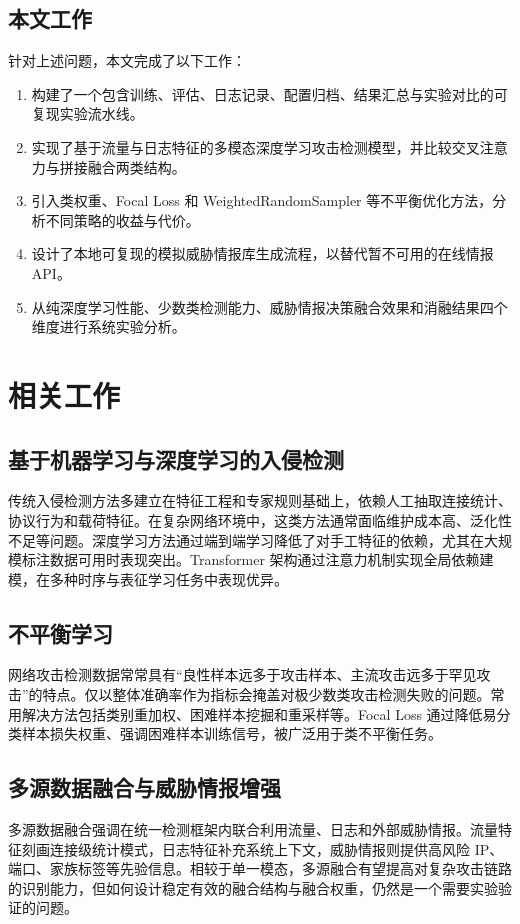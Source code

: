 \documentclass[UTF8,a4paper,12pt]{ctexart}
\begin{document}
\subsection{本文工作}
针对上述问题，本文完成了以下工作：
\begin{enumerate}[leftmargin=2em]
    \item 构建了一个包含训练、评估、日志记录、配置归档、结果汇总与实验对比的可复现实验流水线。
    \item 实现了基于流量与日志特征的多模态深度学习攻击检测模型，并比较交叉注意力与拼接融合两类结构。
    \item 引入类权重、Focal Loss 和 WeightedRandomSampler 等不平衡优化方法，分析不同策略的收益与代价。
    \item 设计了本地可复现的模拟威胁情报库生成流程，以替代暂不可用的在线情报 API。
    \item 从纯深度学习性能、少数类检测能力、威胁情报决策融合效果和消融结果四个维度进行系统实验分析。
\end{enumerate}

\section{相关工作}
\subsection{基于机器学习与深度学习的入侵检测}
传统入侵检测方法多建立在特征工程和专家规则基础上，依赖人工抽取连接统计、协议行为和载荷特征。在复杂网络环境中，这类方法通常面临维护成本高、泛化性不足等问题。深度学习方法通过端到端学习降低了对手工特征的依赖，尤其在大规模标注数据可用时表现突出。Transformer 架构通过注意力机制实现全局依赖建模，在多种时序与表征学习任务中表现优异\cite{vaswani2017attention}。

\subsection{不平衡学习}
网络攻击检测数据常常具有“良性样本远多于攻击样本、主流攻击远多于罕见攻击”的特点。仅以整体准确率作为指标会掩盖对极少数类攻击检测失败的问题。常用解决方法包括类别重加权、困难样本挖掘和重采样等。Focal Loss 通过降低易分类样本损失权重、强调困难样本训练信号，被广泛用于类不平衡任务\cite{lin2017focal}。

\subsection{多源数据融合与威胁情报增强}
多源数据融合强调在统一检测框架内联合利用流量、日志和外部威胁情报。流量特征刻画连接级统计模式，日志特征补充系统上下文，威胁情报则提供高风险 IP、端口、家族标签等先验信息。相较于单一模态，多源融合有望提高对复杂攻击链路的识别能力，但如何设计稳定有效的融合结构与融合权重，仍然是一个需要实验验证的问题。
\end{document}
